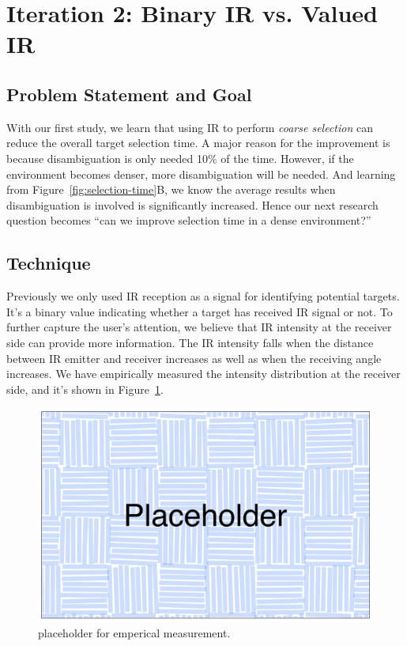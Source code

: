 \section{Iteration 2: Binary IR vs. Valued IR}
\subsection{Problem Statement and Goal}
With our first study, we learn that using IR to perform {\em coarse selection} can reduce the overall target selection time. A major reason for the improvement is because disambiguation is only needed 10\% of the time. 
However, if the environment becomes denser, more disambiguation will be needed. And learning from Figure~\ref{fig:selection-time}B, we know the average results when disambiguation is involved is significantly increased. Hence our next research question becomes ``can we improve selection time in a dense environment?''

\subsection{Technique}
Previously we only used IR reception as a signal for identifying potential targets. It's a binary value indicating whether a target has received IR signal or not. To further capture the user's attention, we believe that IR intensity at the receiver side can provide more information. The IR intensity falls when the distance between IR emitter and receiver increases as well as when the receiving angle increases. We have empirically measured the intensity distribution at the receiver side, and it's shown in Figure~\ref{fig:measurement}. 

\begin{figure}[t]
\centering
\includegraphics[width=0.9\columnwidth]{figures/placeholder.pdf}
\caption{placeholder for emperical measurement.}
\label{fig:measurement}
\end{figure}

